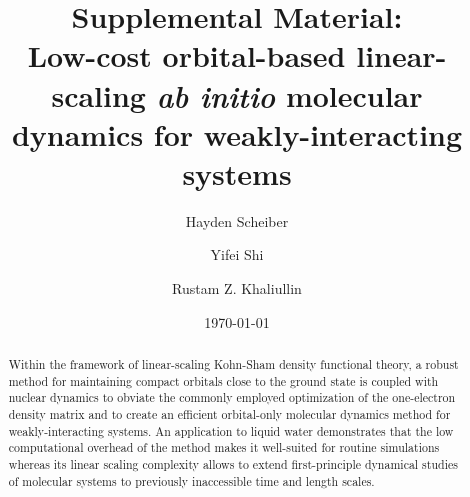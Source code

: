 \documentclass[aps,prl,reprint,amsmath,amssymb]{revtex4-1}
\newcommand*{\MAINTEXT}{}
\begin{document}
\ifdefined\MAINTEXT
\else
	\clearpage
	\setcounter{figure}{0}
	\setcounter{page}{1}
	\renewcommand{\thefigure}{S\arabic{figure}}
\fi

\title{
\ifdefined\MAINTEXT
\else
Supplemental Material: \\
\fi
Low-cost orbital-based linear-scaling \emph{ab initio} molecular dynamics for weakly-interacting systems
}

\author{Hayden Scheiber}
\author{Yifei Shi}
\author{Rustam Z. Khaliullin}

\date{\today}

\ifdefined\MAINTEXT

\begin{abstract}
Within the framework of linear-scaling Kohn-Sham density functional theory, a robust method for maintaining compact orbitals close to the ground state is coupled with nuclear dynamics to obviate the commonly employed optimization of the one-electron density matrix and to create an efficient orbital-only molecular dynamics method for weakly-interacting systems. 
An application to liquid water demonstrates that the low computational overhead of the method makes it well-suited for routine simulations whereas its linear scaling complexity allows to extend first-principle dynamical studies of molecular systems to previously inaccessible time and length scales. 
\end{abstract}

\fi

\maketitle
\end{document}
